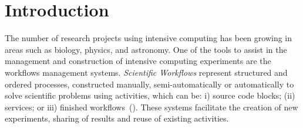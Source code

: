 \documentclass{doublecol-new}
\theoremstyle{TH}{
\newtheorem{lemma}{Lemma}
\newtheorem{theorem}[lemma]{Theorem}
\newtheorem{corrolary}[lemma]{Corrolary}
\newtheorem{conjecture}[lemma]{Conjecture}
\newtheorem{proposition}[lemma]{Proposition}
\newtheorem{claim}[lemma]{Claim}
\newtheorem{stheorem}[lemma]{Wrong Theorem}
\newtheorem{algorithm}{Algorithm}
}
\theoremstyle{THrm}{
\newtheorem{definition}{Definition}[section]
\newtheorem{question}{Question}[section]
\newtheorem{remark}{Remark}
\newtheorem{scheme}{Scheme}
}
\theoremstyle{THhit}{
\newtheorem{case}{Case}[section]
}
\begin{document}

%
%
%


\maketitle

\section*{Introduction}
The number of research projects using intensive computing has been growing in areas such as biology, physics, and astronomy. One of the tools to assist in the management and construction of intensive computing experiments are the workflows management systems. \emph{Scientific Workflows} represent structured and ordered processes, constructed manually, semi-automatically or automatically to solve scientific problems using activities, which can be: i) source code blocks; (ii) services; or iii) finished workflows~(\cite{Wang2010}). These systems facilitate the creation of new experiments, sharing of results and reuse of existing activities.
\end{document}

